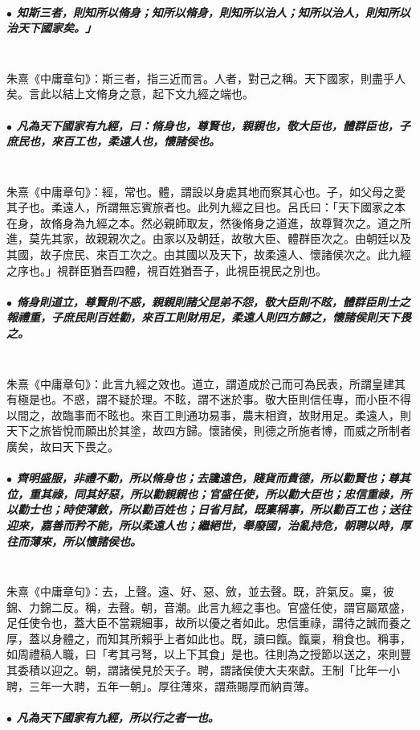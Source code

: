 \documentclass[hyperref, UTF8, 12pt, a4paper]{ctexrep}
\begin{document}
\subparagraph{$\bullet$ 知斯三者，則知所以脩身；知所以脩身，則知所以治人；知所以治人，則知所以治天下國家矣。」} ~\\

朱熹《中庸章句》：斯三者，指三近而言。人者，對己之稱。天下國家，則盡乎人矣。言此以結上文脩身之意，起下文九經之端也。

\subparagraph{$\bullet$ 凡為天下國家有九經，曰：脩身也，尊賢也，親親也，敬大臣也，體群臣也，子庶民也，來百工也，柔遠人也，懷諸侯也。} ~\\

朱熹《中庸章句》：經，常也。體，謂設以身處其地而察其心也。子，如父母之愛其子也。柔遠人，所謂無忘賓旅者也。此列九經之目也。呂氏曰：「天下國家之本在身，故脩身為九經之本。然必親師取友，然後脩身之道進，故尊賢次之。道之所進，莫先其家，故親親次之。由家以及朝廷，故敬大臣、體群臣次之。由朝廷以及其國，故子庶民、來百工次之。由其國以及天下，故柔遠人、懷諸侯次之。此九經之序也。」視群臣猶吾四體，視百姓猶吾子，此視臣視民之別也。

\subparagraph{$\bullet$ 脩身則道立，尊賢則不惑，親親則諸父昆弟不怨，敬大臣則不眩，體群臣則士之報禮重，子庶民則百姓勸，來百工則財用足，柔遠人則四方歸之，懷諸侯則天下畏之。} ~\\

朱熹《中庸章句》：此言九經之效也。道立，謂道成於己而可為民表，所謂皇建其有極是也。不惑，謂不疑於理。不眩，謂不迷於事。敬大臣則信任專，而小臣不得以間之，故臨事而不眩也。來百工則通功易事，農末相資，故財用足。柔遠人，則天下之旅皆悅而願出於其塗，故四方歸。懷諸侯，則德之所施者博，而威之所制者廣矣，故曰天下畏之。

\subparagraph{$\bullet$ 齊明盛服，非禮不動，所以脩身也；去讒遠色，賤貨而貴德，所以勸賢也；尊其位，重其祿，同其好惡，所以勸親親也；官盛任使，所以勸大臣也；忠信重祿，所以勸士也；時使薄斂，所以勸百姓也；日省月試，既稟稱事，所以勸百工也；送往迎來，嘉善而矜不能，所以柔遠人也；繼絕世，舉廢國，治亂持危，朝聘以時，厚往而薄來，所以懷諸侯也。} ~\\

朱熹《中庸章句》：去，上聲。遠、好、惡、斂，並去聲。既，許氣反。稟，彼錦、力錦二反。稱，去聲。朝，音潮。此言九經之事也。官盛任使，謂官屬眾盛，足任使令也，蓋大臣不當親細事，故所以優之者如此。忠信重祿，謂待之誠而養之厚，蓋以身體之，而知其所賴乎上者如此也。既，讀曰餼。餼稟，稍食也。稱事，如周禮稿人職，曰「考其弓弩，以上下其食」是也。往則為之授節以送之，來則豐其委積以迎之。朝，謂諸侯見於天子。聘，謂諸侯使大夫來獻。王制「比年一小聘，三年一大聘，五年一朝」。厚往薄來，謂燕賜厚而納貢薄。

\subparagraph{$\bullet$ 凡為天下國家有九經，所以行之者一也。} ~\\
\end{document}
